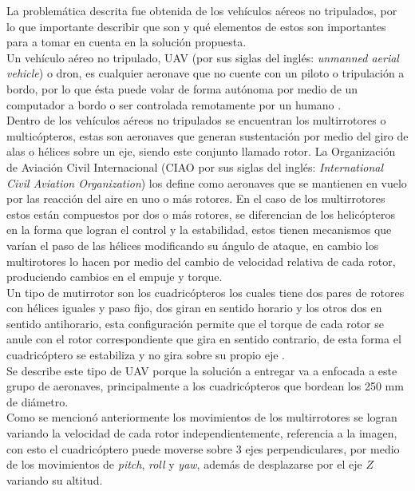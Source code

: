 \documentclass{iccmemoria}
\begin{document}
La problemática descrita fue obtenida de los vehículos aéreos no tripulados, por lo que importante describir que son y qué elementos de estos son importantes para a tomar en cuenta en la solución propuesta.\\

Un vehículo aéreo no tripulado, UAV (por sus siglas del inglés: \emph{unmanned aerial vehicle}) o dron, es cualquier aeronave que no cuente con un piloto o tripulación a bordo, por lo que ésta puede volar de forma autónoma por medio de un computador a bordo o ser controlada remotamente por un humano \cite{icao2011UAS}.\\

Dentro de los vehículos aéreos no tripulados se encuentran los multirrotores o multicópteros, estas son aeronaves que generan sustentación por medio del giro de alas o hélices sobre un eje, siendo este conjunto llamado rotor. La Organización de Aviación Civil Internacional (CIAO por sus siglas del inglés: \emph{International Civil Aviation Organization}) los define como aeronaves que se mantienen en vuelo por las reacción del aire en uno o más rotores. En el caso de los multirrotores estos están compuestos por dos o más rotores, se diferencian de los helicópteros en la forma que logran el control y la estabilidad, estos tienen mecanismos que varían el paso de las hélices modificando su ángulo de ataque, en cambio los multirotores lo hacen por medio del cambio de velocidad relativa de cada rotor, produciendo cambios en el empuje y torque.\\

Un tipo de mutirrotor son los cuadricópteros los cuales tiene dos pares de rotores con hélices iguales y paso fijo, dos giran en sentido horario y los otros dos en sentido antihorario, esta configuración permite que el torque de cada rotor se anule con el rotor correspondiente que gira en sentido contrario, de esta forma el cuadricóptero se estabiliza y no gira sobre su propio eje \cite{AllenQuadcopters}.\\

Se describe este tipo de UAV porque la solución a entregar va a enfocada a este grupo de aeronaves, principalmente a los cuadricópteros que bordean los 250 mm de diámetro.\\  

Como se mencionó anteriormente los movimientos de los multirrotores se logran variando la velocidad de cada rotor independientemente, referencia a la imagen, con esto el cuadricóptero puede moverse sobre 3 ejes perpendiculares, por medio de los movimientos de \emph{pitch}, \emph{roll} y \emph{yaw}, además de desplazarse por el eje $Z$ variando su altitud.\\
\end{document}
